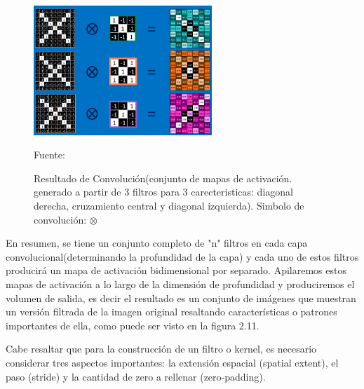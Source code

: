 		\begin{figure}[H]
		\begin{center}
		\includegraphics[width=0.6\textwidth]{images/marcoteorico/result_conv}
		\end{center}
		\begin{center}
		\vskip 0.1cm  
		\caption{\small{Resultado de Convolución(conjunto de mapas de activación. generado a partir de 3 filtros para 3 carecteristicas: diagonal derecha, cruzamiento central y diagonal izquierda). Simbolo de convolución: $\otimes$}}
		\vskip -0.1cm  
		{\small{Fuente: \cite{Rohrer}}}
		\end{center}
		\vspace{-1.9em}
		\end{figure}

		En resumen, se tiene un conjunto completo de "n"  filtros en cada capa convolucional(determinando la profundidad de la capa) y cada uno de estos filtros producirá un mapa de activación bidimensional por separado. Apilaremos estos mapas de activación a lo largo de la dimensión de profundidad y produciremos el volumen de salida, es decir el resultado es un conjunto de imágenes que muestran un versión filtrada de la imagen original resaltando características o patrones importantes de ella, como puede ser visto en la figura 2.11.

		\vskip 0.4cm  
		Cabe resaltar que para la construcción de un filtro o kernel, es necesario considerar tres aspectos importantes: la extensión espacial (spatial extent), el paso (stride) y la cantidad de zero a rellenar (zero-padding).
		\newpage
		
